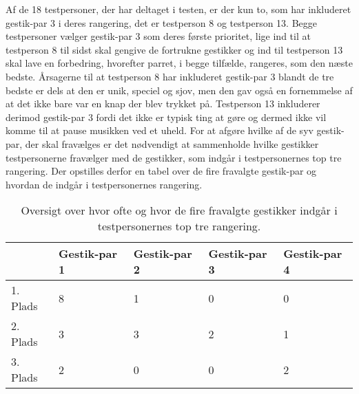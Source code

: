 Af de 18 testpersoner, der har deltaget i testen, er der kun to, som har inkluderet gestik-par 3 i deres rangering, det er testperson 8 og testperson 13. Begge testpersoner vælger gestik-par 3 som deres første prioritet, lige ind til at testperson 8 til sidst skal gengive de fortrukne gestikker og ind til testperson 13 skal lave en forbedring, hvorefter parret, i begge tilfælde, rangeres, som den næste bedste. Årsagerne til at testperson 8 har inkluderet gestik-par 3 blandt de tre bedste er dels at den er unik, speciel og sjov, men den gav også en fornemmelse af at det ikke bare var en knap der blev trykket på. Testperson 13 inkluderer derimod gestik-par 3 fordi det ikke er typisk ting at gøre og dermed ikke vil komme til at pause musikken ved et uheld.\blankline
%
For at afgøre hvilke af de syv gestik-par, der skal fravælges er det nødvendigt at sammenholde hvilke gestikker testpersonerne fravælger med de gestikker, som indgår i testpersonernes top tre rangering. Der opstilles derfor en tabel over de fire fravalgte gestik-par og hvordan de indgår i testpersonernes rangering.
%
\begin{table}[H]
	\centering
	\begin{tabular}{ | p{2.4cm} | p{2.4cm} | p{2.4cm} | p{2.4cm} | p{2.4cm} |}
	\hline
		 & Gestik-par 1 & Gestik-par 2 & Gestik-par 3 & Gestik-par 4 \\ \hline
		1. Plads & 8 & 1 & 0 & 0\\ \hline
		2. Plads & 3 & 3 & 2 & 1\\ \hline
		3. Plads & 2 & 0 & 0 & 2\\ \hline
	\end{tabular}
	\caption{Oversigt over hvor ofte og hvor de fire fravalgte gestikker indgår i testpersonernes top tre rangering.}
	\label{tab:FravalgteTopTrePause}
\end{table}
\noindent
%
